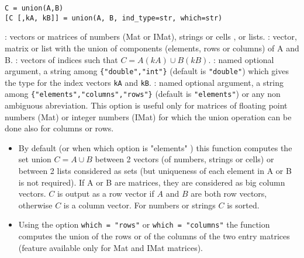 
\begin{mandesc}
\end{mandesc}

\begin{calling_sequence}
\begin{verbatim}
C = union(A,B)
[C [,kA, kB]] = union(A, B, ind_type=str, which=str)
\end{verbatim}
\end{calling_sequence}
\begin{parameters}
  \begin{varlist}
    : vectors or matrices of numbers (Mat or IMat), strings or cells , or lists.
    : vector, matrix or list with the union of components (elements, rows or columns) of A and B.
    : vectors of indices such that $C = A(kA) \cup B(kB)$.
    : named optional argument, a string among \verb+{"double","int"}+ (default is \verb+"double"+)
    which gives the type for the index vectors  \verb+kA+ and \verb+kB+. 
    : named optional argument, a string among \verb+{"elements","columns","rows"}+ (default is
    \verb+"elements"+) or any non ambiguous abreviation. This option is useful only for matrices of floating 
       point numbers (Mat) or integer numbers (IMat) for which the union operation can be done also for
       columns or rows.
  \end{varlist}
\end{parameters}

\begin{mandescription}
\begin{itemize}
\item  By default (or when which option is "elements" ) this function computes the set 
  union $C = A \cup B$ between 2 vectors (of numbers, strings or cells) or between 2
  lists considered as sets (but uniqueness of each element in A or B is not
  required). If A or B are matrices, they  are considered as big column vectors.
  $C$ is output as a row vector if  $A$ and $B$ are both 
  row vectors, otherwise $C$ is a column vector. For numbers or strings $C$ 
  is sorted. 

\item  Using the option \verb+which = "rows"+ or \verb+which = "columns"+  the function 
  computes the union of the rows or of the columns of the two entry 
  matrices (feature available only for Mat and IMat matrices).

\end{itemize}

\end{mandescription}


